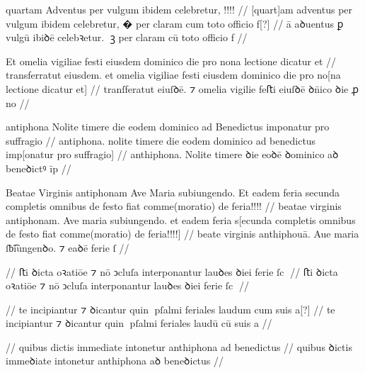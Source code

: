 \ex \bg
\gla
{}
quartam Adventus per vulgum
ibidem celebretur, !!!!
//
\glRekonstrukcja
{}
[quart]am adventus per vulgum
ibidem celebretur, � per claram cum toto officio f[?]
//
\glU
{}
ā aꝺuentus ꝑ vulgū ibiꝺē celebꝛetur. ꝫ per claram cū toto oﬀicio f
//
\endgl
\xe




\ex \bg
\gla
{}
{} {}  Et omelia vigiliae festi eiusdem dominico die pro nona
lectione dicatur et 
//
\glRekonstrukcja
{}
transferratut eiusdem. et omelia vigiliae festi eiusdem dominico die pro no[na
lectione dicatur et]
//
\glU
{}
tranſferatut eiuſꝺē. ⁊ omelia vigilie feﬅi eiuſꝺē ꝺn̄ico ꝺie ꝓ no   
//
\endgl
\xe


\ex \bg
\gla
{}
antiphona Nolite timere die eodem dominico ad Benedictus imponatur pro suffragio 
//
\glRekonstrukcja
{}
antiphona. nolite timere die eodem dominico ad benedictus imp[onatur pro suffragio] 
//
\glU
{}
anthiphona. Nolite timere ꝺie eoꝺē ꝺominico aꝺ beneꝺictꝰ īp  
//
\endgl
\xe



\ex \bg
\gla
{}
Beatae Virginis antiphonam Ave Maria
subiungendo. Et eadem feria secunda completis omnibus de festo fiat
comme(moratio) de feria!!!!
//
\glRekonstrukcja
{}
beatae virginis antiphonam. Ave maria
subiungendo. et eadem feria s[ecunda completis omnibus de festo fiat
comme(moratio) de feria!!!!]
//
\glU
{}
beate virginis anthiphouā. Aue maria ſƀ͡iungenꝺo. ⁊ eaꝺē ferie ſ
//
\endgl
\xe



\ex \bg
\gla
{}
{} {} {} {} {} {} {} {} {} {}
{} {} {} {} {} {} {} {} {} {}
//
\glRekonstrukcja
{} ﬅi ꝺicta oꝛatiōe ⁊ nō ↄcluſa interponantur lauꝺes ꝺiei ferie ſc
//
\glU
{}
ﬅi ꝺicta oꝛatiōe ⁊ nō ↄcluſa interponantur lauꝺes ꝺiei ferie ſc
//
\endgl
\xe


\ex \bg
\gla
{}
{} {} {} {} {} {} {} {} {} {}
{} {} {} {} {} {} {} {} {} {}
//
\glRekonstrukcja
{} te incipiantur ⁊ ꝺicantur quin pſalmi feriales laudum cum suis a[?]
//
\glU
{}
te incipiantur ⁊ ꝺicantur quin pſalmi feriales laudū cū suis a
//
\endgl
\xe

\ex \bg
\gla
{}
{}
{} {} {} {} {} {} {} {} {} {}
{} {} {} {} {} {} {} {} {} {}
//
\glRekonstrukcja
{} quibus dictis immediate intonetur anthiphona ad benedictus
//
\glU
{}
quibus ꝺictis immeꝺiate intonetur anthiphona aꝺ beneꝺictus
//
\endgl
\xe


